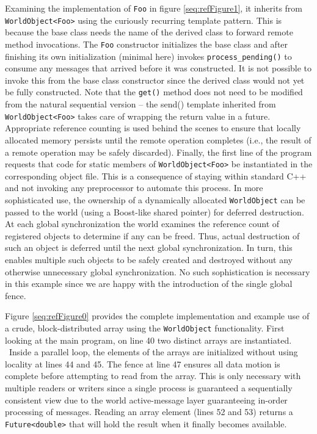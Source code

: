 \documentclass[letterpaper]{article}
\newcounter{Figure}
\begin{document}
Examining the implementation of \texttt{Foo} in figure \ref{seq:refFigure1}, it inherits from
\texttt{WorldObject{\textless}Foo{\textgreater}} using the curiously recurring template pattern. This is because the
base class needs the name of the derived class to forward remote method invocations. The \texttt{Foo} constructor
initializes the base class and after finishing its own initialization (minimal here) invokes
\texttt{process\_pending()} to consume any messages that arrived before it was constructed. It is not possible to
invoke this from the base class constructor since the derived class would not yet be fully constructed. Note that the
\texttt{get()} method does not need to be modified from the natural sequential version -- the send() template inherited
from \texttt{WorldObject{\textless}Foo{\textgreater}} takes care of wrapping the return value in a future. Appropriate
reference counting is used behind the scenes to ensure that locally allocated memory persists until the remote
operation completes (i.e., the result of a remote operation may be safely discarded). Finally, the first line of the
program requests that code for static members of \texttt{WorldObject{\textless}Foo{\textgreater}} be instantiated in
the corresponding object file. This is a consequence of staying within standard C++ and not invoking any preprocessor
to automate this process. In more sophisticated use, the ownership of a dynamically allocated \texttt{WorldObject} can
be passed to the world (using a Boost-like shared pointer) for deferred destruction. At each global synchronization the
world examines the reference count of registered objects to determine if any can be freed. Thus, actual destruction of
such an object is deferred until the next global synchronization. In turn, this enables multiple such objects to be
safely created and destroyed without any otherwise unnecessary global synchronization. No such sophistication is
necessary in this example since we are happy with the introduction of the single global fence.

Figure \ref{seq:refFigure0} provides the complete implementation and example use of a crude, block-distributed array
using the \texttt{WorldObject} functionality. First looking at the main program, on line 40 two distinct arrays are
instantiated. \ Inside a parallel loop, the elements of the arrays are initialized without using locality at lines 44
and 45. The fence at line 47 ensures all data motion is complete before attempting to read from the array. This is only
necessary with multiple readers or writers since a single process is guaranteed a sequentially consistent view due to
the world active-message layer guaranteeing in-order processing of messages. Reading an array element (lines 52 and 53)
returns a \texttt{Future{\textless}double{\textgreater}} that will hold the result when it finally becomes available. 
\end{document}
